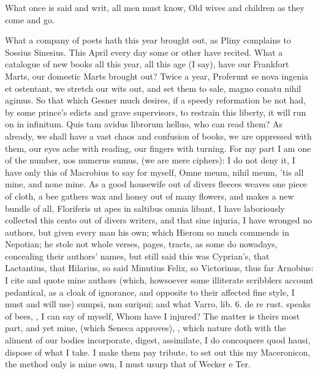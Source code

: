 {What once is said and writ, all men must know,
Old wives and children as they come and go.

What a company of poets hath this year brought out, as Pliny complains
to Sossius Sinesius. This April every day some or other have
recited. What a catalogue of new books all this year, all this age (I
say), have our Frankfort Marts, our domestic Marts brought out? Twice a
year,  Proferunt se nova ingenia et ostentant, we stretch our wits
out, and set them to sale, magno conatu nihil agimus. So that which
Gesner much desires, if a speedy reformation be not had, by some
prince's edicts and grave supervisors, to restrain this liberty, it
will run on in infinitum. Quis tam avidus librorum helluo, who can read
them? As already, we shall have a vast chaos and confusion of books, we
are oppressed with them, our eyes ache with reading, our
fingers with turning. For my part I am one of the number, nos numerus
sumus, (we are mere ciphers): I do not deny it, I have only this of
Macrobius to say for myself, Omne meum, nihil meum, 'tis all mine, and
none mine. As a good housewife out of divers fleeces weaves one piece
of cloth, a bee gathers wax and honey out of many flowers, and makes a
new bundle of all, \textlatin{Floriferis ut apes in saltibus omnia libant}, I have
laboriously collected this cento out of divers writers, and that
sine injuria, I have wronged no authors, but given every man his own;
which Hierom so much commends in Nepotian; he stole not whole
verses, pages, tracts, as some do nowadays, concealing their authors'
names, but still said this was Cyprian's, that Lactantius, that
Hilarius, so said Minutius Felix, so Victorinus, thus far Arnobius: I
cite and quote mine authors (which, howsoever some illiterate
scribblers account pedantical, as a cloak of ignorance, and opposite to
their affected fine style, I must and will use) sumpsi, non suripui;
and what Varro, lib. 6. de re rust. speaks of bees, , I can say of myself, Whom
have I injured? The matter is theirs most part, and yet mine,  (which Seneca approves), , which nature doth with the aliment of our bodies
incorporate, digest, assimilate, I do concoquere quod hausi, dispose of
what I take. I make them pay tribute, to set out this my Maceronicon,
the method only is mine own, I must usurp that of Wecker e Ter.
}
